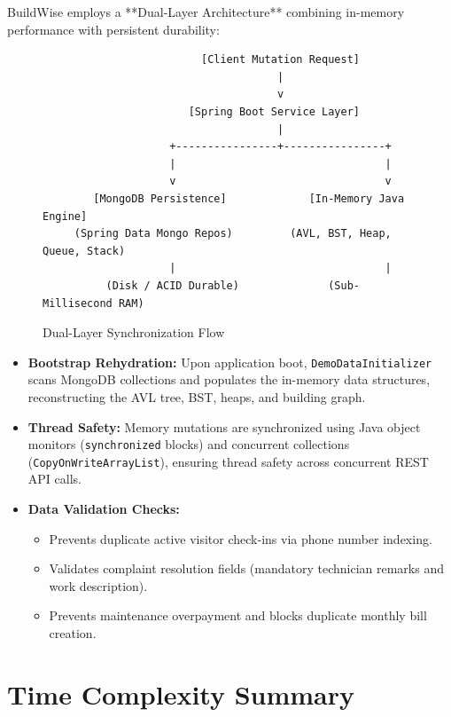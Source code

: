 \documentclass[12pt,a4paper]{article}
\begin{document}
BuildWise employs a **Dual-Layer Architecture** combining in-memory performance with persistent durability:

\begin{figure}[H]
\centering
\begin{verbatim}
                         [Client Mutation Request]
                                     |
                                     v
                       [Spring Boot Service Layer]
                                     |
                    +----------------+----------------+
                    |                                 |
                    v                                 v
        [MongoDB Persistence]             [In-Memory Java Engine]
     (Spring Data Mongo Repos)         (AVL, BST, Heap, Queue, Stack)
                    |                                 |
          (Disk / ACID Durable)              (Sub-Millisecond RAM)
\end{verbatim}
\caption{Dual-Layer Synchronization Flow}
\label{fig:sync_flow}
\end{figure}

\begin{itemize}[leftmargin=1.5em]
    \item \textbf{Bootstrap Rehydration:} Upon application boot, \texttt{DemoDataInitializer} scans MongoDB collections and populates the in-memory data structures, reconstructing the AVL tree, BST, heaps, and building graph.
    \item \textbf{Thread Safety:} Memory mutations are synchronized using Java object monitors (\texttt{synchronized} blocks) and concurrent collections (\texttt{CopyOnWriteArrayList}), ensuring thread safety across concurrent REST API calls.
    \item \textbf{Data Validation Checks:}
    \begin{itemize}
        \item Prevents duplicate active visitor check-ins via phone number indexing.
        \item Validates complaint resolution fields (mandatory technician remarks and work description).
        \item Prevents maintenance overpayment and blocks duplicate monthly bill creation.
    \end{itemize}
\end{itemize}

\section{Time Complexity Summary}
\end{document}
